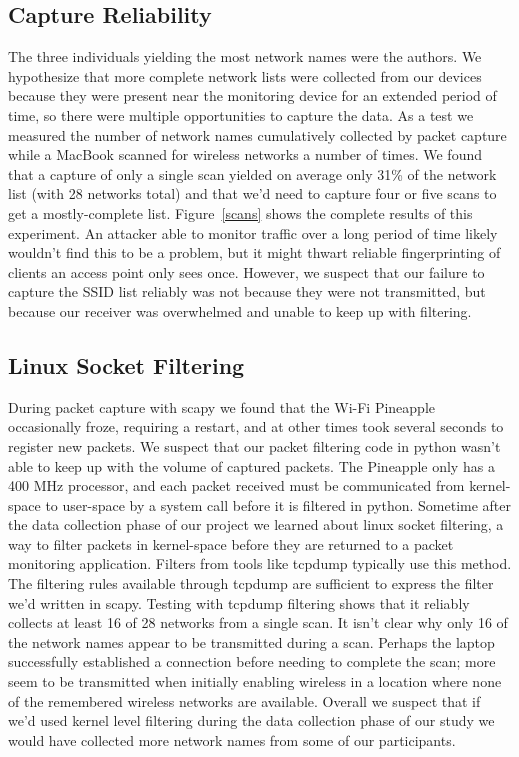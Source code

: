 \documentclass[letterpaper,twocolumn,10pt]{article}
\begin{document}
\FloatBarrier

\subsection{Capture Reliability}
The three individuals yielding the most network names were the authors. We hypothesize that more complete network lists were collected from our devices because they were present near the monitoring device for an extended period of time, so there were multiple opportunities to capture the data. As a test we measured the number of network names cumulatively collected by packet capture while a MacBook scanned for wireless networks a number of times. We found that a capture of only a single scan yielded on average only 31\% of the network list (with 28 networks total) and that we'd need to capture four or five scans to get a mostly-complete list. Figure~\ref{scans} shows the complete results of this experiment. An attacker able to monitor traffic over a long period of time likely wouldn't find this to be a problem, but it might thwart reliable fingerprinting of clients an access point only sees once. However, we suspect that our failure to capture the SSID list reliably was not because they were not transmitted, but because our receiver was overwhelmed and unable to keep up with filtering.

\subsection{Linux Socket Filtering}
During packet capture with scapy we found that the Wi-Fi Pineapple occasionally froze, requiring a restart, and at other times took several seconds to register new packets. We suspect that our packet filtering code in python wasn't able to keep up with the volume of captured packets. The Pineapple only has a 400 MHz processor, and each packet received must be communicated from kernel-space to user-space by a system call before it is filtered in python. Sometime after the data collection phase of our project we learned about linux socket filtering, a way to filter packets in kernel-space before they are returned to a packet monitoring application. Filters from tools like tcpdump typically use this method. The filtering rules available through tcpdump are sufficient to express the filter we'd written in scapy. Testing with tcpdump filtering shows that it reliably collects at least 16 of 28 networks from a single scan. It isn't clear why only 16 of the network names appear to be transmitted during a scan. Perhaps the laptop successfully established a connection before needing to complete the scan; more seem to be transmitted when initially enabling wireless in a location where none of the remembered wireless networks are available. Overall we suspect that if we'd used kernel level filtering during the data collection phase of our study we would have collected more network names from some of our participants.
\end{document}
